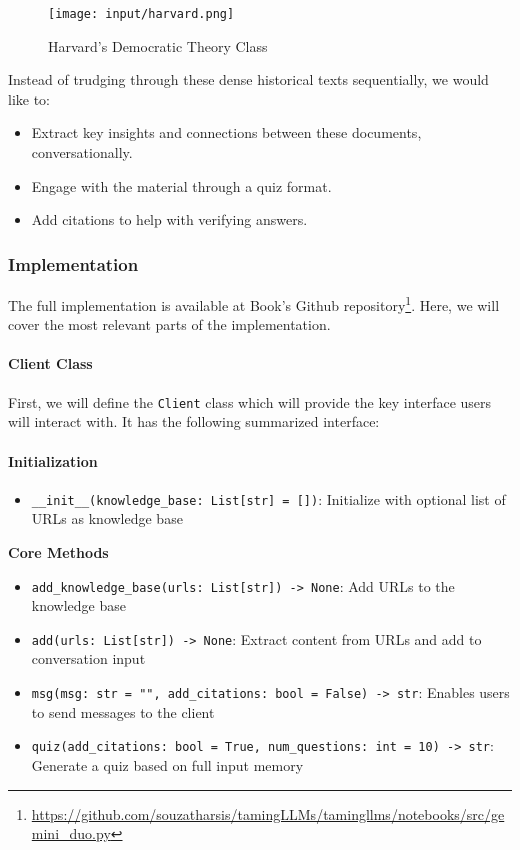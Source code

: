 \begin{figure}[H]
\centering
\texttt{[image: input/harvard.png]}
\caption{Harvard's Democratic Theory Class}
\label{fig:harvard-class}
\end{figure}

Instead of trudging through these dense historical texts sequentially, we would like to:
\begin{itemize}
\item Extract key insights and connections between these documents, conversationally.
\item Engage with the material through a quiz format.
\item Add citations to help with verifying answers.
\end{itemize}

\subsubsection{Implementation}

The full implementation is available at Book's Github repository\footnote{\url{https://github.com/souzatharsis/tamingLLMs/tamingllms/notebooks/src/gemini_duo.py}}. Here, we will cover the most relevant parts of the implementation.

\paragraph{Client Class}

First, we will define the \texttt{Client} class which will provide the key interface users will interact with. It has the following summarized interface:

\paragraph{Initialization}
\begin{itemize}
\item \texttt{\_\_init\_\_(knowledge\_base: List[str] = [])}: Initialize with optional list of URLs as knowledge base
\end{itemize}

\textbf{Core Methods}
\begin{itemize}
\item \texttt{add\_knowledge\_base(urls: List[str]) -> None}: Add URLs to the knowledge base
\item \texttt{add(urls: List[str]) -> None}: Extract content from URLs and add to conversation input  
\item \texttt{msg(msg: str = "", add\_citations: bool = False) -> str}: Enables users to send messages to the client
\item \texttt{quiz(add\_citations: bool = True, num\_questions: int = 10) -> str}: Generate a quiz based on full input memory
\end{itemize}

